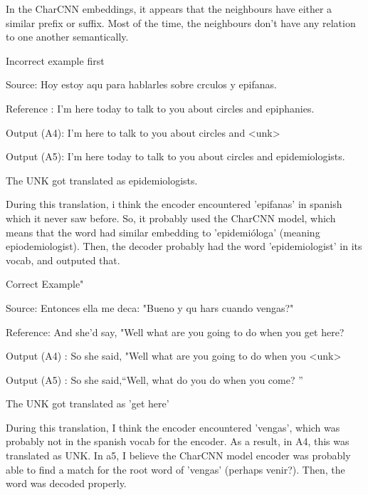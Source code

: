 \documentclass[11pt,largemargins]{homework}
\begin{document}
In the CharCNN embeddings, it appears that the neighbours have either a similar prefix or suffix. Most of the time, the neighbours don't have any relation to one another semantically. 

\question 
Incorrect example first 


Source: Hoy estoy aqu para hablarles sobre crculos y epifanas.

Reference : I'm here today to talk to you  about circles and epiphanies.
 
Output (A4): I'm here to talk to you about circles and <unk>
 
Output (A5): I'm here today to talk to you about circles and epidemiologists.


The UNK got translated as epidemiologists. 

During this translation, i think the encoder encountered 'epifanas' in spanish which it never saw before. So, it probably used the CharCNN model, which means that the word had similar embedding to 'epidemióloga' (meaning epiodemiologist). Then, the decoder probably had the word 'epidemiologist' in its vocab, and outputed that. 
 
Correct Example"

Source: Entonces ella me deca: "Bueno y qu hars cuando vengas?"   

Reference: And she'd say, "Well what are you going to do when you get here?

Output (A4) : So she said, "Well what are you going to do when you <unk>

Output (A5) : So she said,``Well, what do you do  when you come? ''

The UNK got translated as 'get here'

During this translation, I think the encoder encountered 'vengas', which was probably not in the spanish vocab for the encoder. As a result, in A4, this was translated as UNK. In a5, I believe the CharCNN model encoder was probably able to find a match for the root word of 'vengas' (perhaps venir?). Then, the word was decoded properly. 
\end{document}
